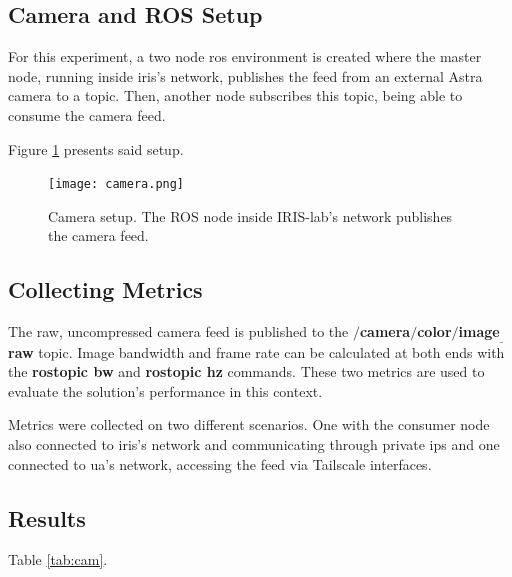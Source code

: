 \documentclass[11pt,twoside,a4paper]{report}
\begin{document}
\subsection{Camera and ROS Setup}

For this experiment, a two node \ac{ros} environment is created where the master node, running inside \ac{iris}'s network, publishes the feed from an external Astra camera to a topic. Then, another node subscribes this topic, being able to consume the camera feed.

Figure \ref{fig:camera} presents said setup.


\begin{figure}[h]
\centering
  \texttt{[image: camera.png]}
  \caption{Camera setup. The ROS node inside IRIS-lab's network publishes the camera feed.}
  \label{fig:camera}
\end{figure}

\subsection{Collecting Metrics}

The raw, uncompressed camera feed is published to the \textbf{$/$camera$/$color$/$image$_\_$raw} topic. Image bandwidth and frame rate can be calculated at both ends with the \textbf{rostopic bw} and \textbf{rostopic hz} commands. These two metrics are used to evaluate the solution's performance in this context.

Metrics were collected on two different scenarios. One with the consumer node also connected to \ac{iris}'s network and communicating through private \acp{ip} and one connected to \ac{ua}'s network, accessing the feed via Tailscale interfaces.

\subsection{Results}

Table \ref{tab:cam}.
\end{document}
